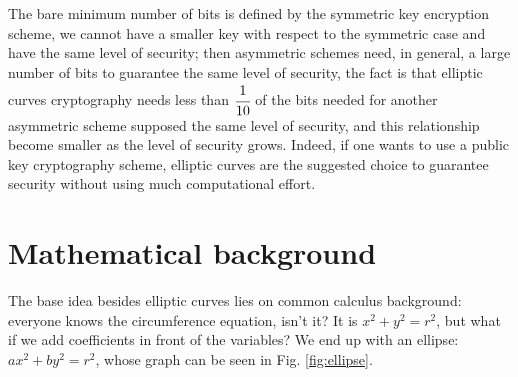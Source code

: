 \documentclass{article}
\begin{document}
The bare minimum number of bits is defined by the symmetric key encryption scheme, we cannot have a smaller key with respect to the symmetric case and have the same level of security; then asymmetric schemes need, in general, a large number of bits to guarantee the same level of security, the fact is that elliptic curves cryptography needs less than $\cfrac{1}{10}$ of the bits needed for another asymmetric scheme supposed the same level of security, and this relationship become smaller as the level of security grows. Indeed, if one wants to use a public key cryptography scheme, elliptic curves are the suggested choice to guarantee security without using much computational effort.


\section{Mathematical background}

The base idea besides elliptic curves lies on common calculus background: everyone knows the circumference equation, isn't it? It is $x^2 + y^2 = r^2$, but what if we add coefficients in front of the variables? We end up with an ellipse: $ax^2 + by^2 = r^2$, whose graph can be seen in Fig. \ref{fig:ellipse}. 
\end{document}
